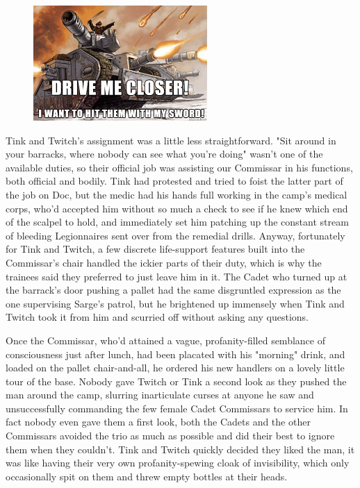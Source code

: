 \begin{figure}
	\begin{center}
		\includegraphics[width=\figwidth]{pics/21/22.png}
	\end{center}
\end{figure}
Tink and Twitch's assignment was a little less straightforward. 
"Sit around in your barracks, where nobody can see what you're doing" wasn't one of the available duties, so their official job was assisting our Commissar in his functions, both official and bodily. 
Tink had protested and tried to foist the latter part of the job on Doc, but the medic had his hands full working in the camp's medical corps, who'd accepted him without so much a check to see if he knew which end of the scalpel to hold, and immediately set him patching up the constant stream of bleeding Legionnaires sent over from the remedial drills. 
Anyway, fortunately for Tink and Twitch, a few discrete life-support features built into the Commissar's chair handled the ickier parts of their duty, which is why the trainees said they preferred to just leave him in it. 
The Cadet who turned up at the barrack's door pushing a pallet had the same disgruntled expression as the one supervising Sarge's patrol, but he brightened up immensely when Tink and Twitch took it from him and scurried off without asking any questions.

Once the Commissar, who'd attained a vague, profanity-filled semblance of consciousness just after lunch, had been placated with his "morning" drink, and loaded on the pallet chair-and-all, he ordered his new handlers on a lovely little tour of the base. 
Nobody gave Twitch or Tink a second look as they pushed the man around the camp, slurring inarticulate curses at anyone he saw and unsuccessfully commanding the few female Cadet Commissars to service him. 
In fact nobody even gave them a first look, both the Cadets and the other Commissars avoided the trio as much as possible and did their best to ignore them when they couldn't. 
Tink and Twitch quickly decided they liked the man, it was like having their very own profanity-spewing cloak of invisibility, which only occasionally spit on them and threw empty bottles at their heads.

